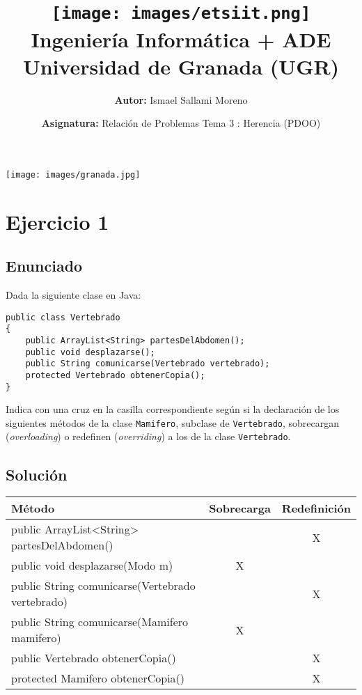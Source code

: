 \documentclass[a4paper,12pt]{article}
\title{
    \vspace{-2cm}
    \texttt{[image: images/etsiit.png]} \\ %
    \LARGE Ingeniería Informática + ADE\\
    \large Universidad de Granada (UGR)\\[1cm]
}
\author{\textbf{Autor:} Ismael Sallami Moreno}
\date{\textbf{Asignatura:} Relación de Problemas Tema 3 : Herencia (PDOO)\\[1cm]}
\begin{document}
\maketitle
\thispagestyle{empty}

\begin{center}
    \texttt{[image: images/granada.jpg]} \\ %
    \vfill
\end{center}

\newpage

\tableofcontents
\newpage

\section{Ejercicio 1}
\subsection{Enunciado}




Dada la siguiente clase en Java:

\begin{lstlisting}[style=customjava]
public class Vertebrado
{
    public ArrayList<String> partesDelAbdomen();
    public void desplazarse();
    public String comunicarse(Vertebrado vertebrado);
    protected Vertebrado obtenerCopia();
}
\end{lstlisting}

Indica con una cruz en la casilla correspondiente según si la declaración de los siguientes métodos de la clase \texttt{Mamifero}, subclase de \texttt{Vertebrado}, sobrecargan (\emph{overloading}) o redefinen (\emph{overriding}) a los de la clase \texttt{Vertebrado}.

\subsection{Solución}


\begin{table}[H]
    \centering
    \begin{tabular}{|l|c|c|}
    \hline
    \textbf{Método} & \textbf{Sobrecarga} & \textbf{Redefinición} \\ \hline
    public ArrayList<String> partesDelAbdomen() &  & X \\ \hline
    public void desplazarse(Modo m) & X &  \\ \hline
    public String comunicarse(Vertebrado vertebrado) &  & X \\ \hline
    public String comunicarse(Mamifero mamifero) & X &  \\ \hline
    public Vertebrado obtenerCopia() &  & X \\ \hline
    protected Mamifero obtenerCopia() &  & X \\ \hline
    \end{tabular}
\end{table}
\end{document}
